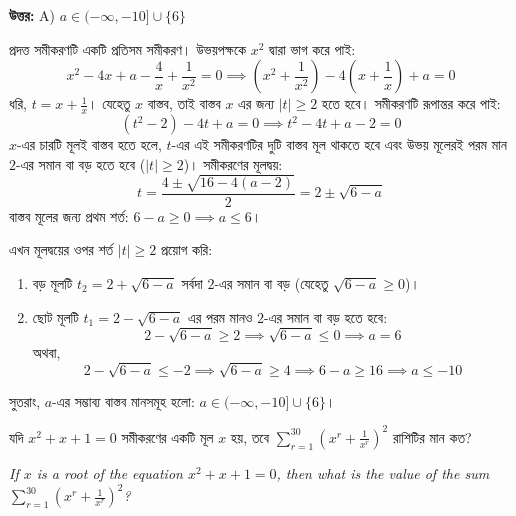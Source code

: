 \documentclass[12pt, a4paper]{article}
\begin{document}
\vspace{0.5em}
\begin{tcolorbox}[answerbox]
    \textbf{\color{success} উত্তর:} A) $a \in (-\infty, -10] \cup \{6\}$
\end{tcolorbox}
\vspace{1em}

\begin{tcolorbox}[solutionbox={সমাধান (Solution)}]
    \noindent
    প্রদত্ত সমীকরণটি একটি প্রতিসম সমীকরণ। উভয়পক্ষকে $x^2$ দ্বারা ভাগ করে পাই:
    \[ x^2 - 4x + a - \frac{4}{x} + \frac{1}{x^2} = 0 \implies \left(x^2 + \frac{1}{x^2}\right) - 4\left(x + \frac{1}{x}\right) + a = 0 \]
    ধরি, $t = x + \frac{1}{x}$। যেহেতু $x$ বাস্তব, তাই বাস্তব $x$ এর জন্য $|t| \ge 2$ হতে হবে। 
    সমীকরণটি রূপান্তর করে পাই:
    \[ (t^2 - 2) - 4t + a = 0 \implies t^2 - 4t + a - 2 = 0 \]
    $x$-এর চারটি মূলই বাস্তব হতে হলে, $t$-এর এই সমীকরণটির দুটি বাস্তব মূল থাকতে হবে এবং উভয় মূলেরই পরম মান $2$-এর সমান বা বড় হতে হবে ($|t| \ge 2$)। 
    সমীকরণের মূলদ্বয়:
    \[ t = \frac{4 \pm \sqrt{16 - 4(a-2)}}{2} = 2 \pm \sqrt{6-a} \]
    বাস্তব মূলের জন্য প্রথম শর্ত: $6-a \ge 0 \implies a \le 6$।
    
    \vspace{0.5em}
    এখন মূলদ্বয়ের ওপর শর্ত $|t| \ge 2$ প্রয়োগ করি:
    \begin{enumerate}[itemsep=0.3em]
        \item বড় মূলটি $t_2 = 2 + \sqrt{6-a}$ সর্বদা $2$-এর সমান বা বড় (যেহেতু $\sqrt{6-a} \ge 0$)।
        \item ছোট মূলটি $t_1 = 2 - \sqrt{6-a}$ এর পরম মানও $2$-এর সমান বা বড় হতে হবে:
        \[ 2 - \sqrt{6-a} \ge 2 \implies \sqrt{6-a} \le 0 \implies a = 6 \]
        অথবা,
        \[ 2 - \sqrt{6-a} \le -2 \implies \sqrt{6-a} \ge 4 \implies 6-a \ge 16 \implies a \le -10 \]
    \end{enumerate}
    সুতরাং, $a$-এর সম্ভাব্য বাস্তব মানসমূহ হলো: $a \in (-\infty, -10] \cup \{6\}$।
\end{tcolorbox}
\begin{tcolorbox}[questionbox={প্রশ্ন (Question) 47}]
    \noindent
    যদি $x^2 + x + 1 = 0$ সমীকরণের একটি মূল $x$ হয়, তবে $\sum_{r=1}^{30} \left(x^r + \frac{1}{x^r}\right)^2$ রাশিটির মান কত?
    
    \vspace{0.8em}
    \begin{english}
    \noindent\textit{\color{darkgray}
    If $x$ is a root of the equation $x^2 + x + 1 = 0$, then what is the value of the sum $\sum_{r=1}^{30} \left(x^r + \frac{1}{x^r}\right)^2$?
    }
    \end{english}
\end{tcolorbox}
\end{document}
